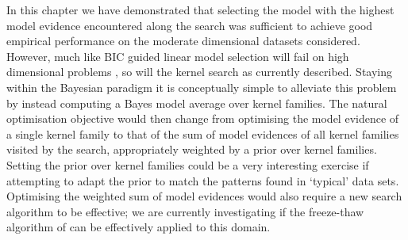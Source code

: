 In this chapter we have demonstrated that selecting the model with the highest model evidence encountered along the search was sufficient to achieve good empirical performance on the moderate dimensional datasets considered.
However, much like BIC guided linear model selection will fail on high dimensional problems \citep[e.g.][]{Hastie2009-hj}, so will the kernel search as currently described.
Staying within the Bayesian paradigm it is conceptually simple to alleviate this problem by instead computing a Bayes model average \citep[e.g.][]{Hoeting1999-tn} over kernel families.
The natural optimisation objective would then change from optimising the model evidence of a single kernel family to that of the sum of model evidences of all kernel families visited by the search, appropriately weighted by a prior over kernel families.
Setting the prior over kernel families could be a very interesting exercise if attempting to adapt the prior to match the patterns found in `typical' data sets.
Optimising the weighted sum of model evidences would also require a new search algorithm to be effective; we are currently investigating if the freeze-thaw algorithm of \citet{Swersky2014-aw} can be effectively applied to this domain.

\outbpdocument{


}